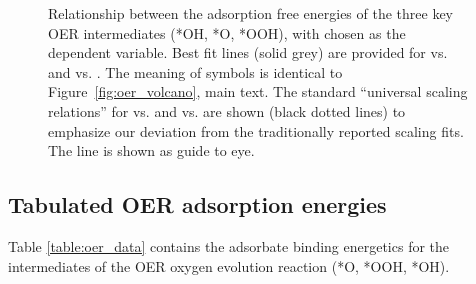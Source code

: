 \begin{figure}[!htb]
\centering
{}
\caption{\label{fig:scaling_relations}
%
Relationship between the adsorption free energies of the three key OER intermediates (*OH, *O, *OOH), with \DGOH chosen as the dependent variable.
%
Best fit lines (solid grey) are provided for \DGOOH vs. \DGOH and \DGO vs. \DGOH.
%
The meaning of symbols is identical to Figure~\ref{fig:oer_volcano}, main text.
%
The standard ``universal scaling relations'' for \DGOOH vs. \DGOH and \DGO vs. \DGOH are shown (black dotted lines) to emphasize our deviation from the traditionally reported scaling fits.
%
The \DGOH line is shown as guide to eye.
}
\end{figure}


\subsection{Tabulated OER adsorption energies}
%


%
%
Table \ref{table:oer_data} contains the adsorbate binding energetics for the intermediates of the OER
oxygen evolution reaction (*O, *OOH, *OH).


